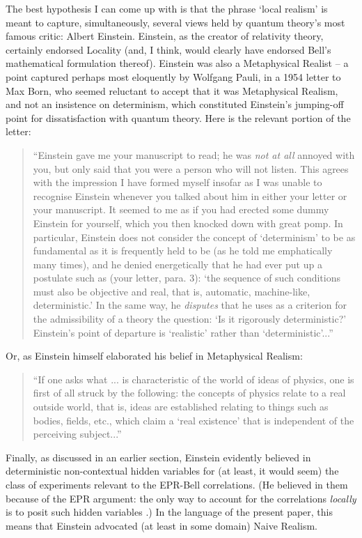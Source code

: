 \documentclass[12pt]{article}
\begin{document}
The best hypothesis I can come up with is that the phrase `local
realism' is meant to capture, simultaneously, several views held by
quantum theory's most famous critic:  Albert Einstein.  Einstein, as
the creator of relativity theory, certainly endorsed Locality (and, I
think, would clearly have endorsed Bell's mathematical formulation 
thereof).  Einstein was also a Metaphysical Realist -- a point
captured perhaps most eloquently by Wolfgang Pauli, in a 1954 letter
to Max Born, who seemed reluctant to accept that it was Metaphysical
Realism, and not an insistence on determinism, which constituted Einstein's
jumping-off point for dissatisfaction with quantum theory.  Here is
the relevant portion of the letter:
\begin{quote}
``Einstein gave me your manuscript to read; he was \emph{not at all}
annoyed with you, but only said that you were a person who will not
listen.  This agrees with the impression I have formed myself insofar
as I was unable to recognise Einstein whenever you talked about him in
either your letter or your manuscript.  It seemed to me as if you had
erected some dummy Einstein for yourself, which you then knocked down
with great pomp.  In particular, Einstein does not consider the
concept of `determinism' to be as fundamental as it is frequently held
to be (as he told me emphatically many times), and he denied
energetically that he had ever put up a postulate such as (your
letter, para. 3): `the sequence of such conditions must also be
objective and real, that is, automatic, machine-like, deterministic.'
In the same way, he \emph{disputes} that he uses as a criterion for
the admissibility of a theory the question: `Is it rigorously
deterministic?'  Einstein's point of departure is `realistic' rather than
`deterministic'...'' \cite[page 221]{bel}
\end{quote}
Or, as Einstein himself elaborated his belief in Metaphysical Realism:
\begin{quote}
``If one asks what ... is characteristic of the world of ideas of
physics, one is first of all struck by the following:  the concepts of
physics relate to a real outside world, that is, ideas are established
relating to things such as bodies, fields, etc., which claim a `real
existence' that is independent of the perceiving
subject...'' \cite[170]{bel}
\end{quote}
Finally, as discussed in an earlier section, Einstein evidently
believed in deterministic non-contextual hidden variables for (at
least, it would seem) the class of experiments relevant to the 
EPR-Bell correlations.  (He believed in them because of the EPR
argument:  the only way to account for the correlations
\emph{locally} is to posit such hidden variables \cite{nonlocchar}.)  
In the language of the present paper, this means that Einstein
advocated (at least in some domain) Naive Realism.  
\end{document}
